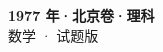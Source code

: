 \documentclass[zihao=-4, a4paper]{ctexart}
\begin{document}
\begin{center}
  {\Large\bfseries 1977 年·北京卷·理科}\\[4pt]
  {\large 数学 · 试题版}
\end{center}
\medskip
{}

\end{document}
